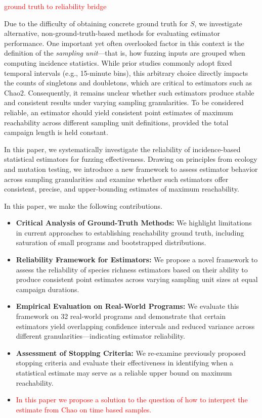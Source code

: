 \documentclass[conference]{IEEEtran}
\begin{document}
\textcolor{red}{ground truth to reliability bridge}

Due to the difficulty of obtaining concrete ground truth for $S$, we investigate alternative, non-ground-truth-based methods for evaluating estimator performance. One important yet often overlooked factor in this context is the definition of the \emph{sampling unit}—that is, how fuzzing inputs are grouped when computing incidence statistics. While prior studies commonly adopt fixed temporal intervals (e.g., 15-minute bins), this arbitrary choice directly impacts the counts of singletons and doubletons, which are critical to estimators such as Chao2. Consequently, it remains unclear whether such estimators produce stable and consistent results under varying sampling granularities. To be considered reliable, an estimator should yield consistent point estimates of maximum reachability across different sampling unit definitions, provided the total campaign length is held constant.

In this paper, we systematically investigate the reliability of incidence-based statistical estimators for fuzzing effectiveness. Drawing on principles from ecology and mutation testing, we introduce a new framework to assess estimator behavior across sampling granularities and examine whether such estimators offer consistent, precise, and upper-bounding estimates of maximum reachability. 

In this paper, we make the following contributions.

\begin{itemize}
    \item \textbf{Critical Analysis of Ground-Truth Methods:} We highlight limitations in current approaches to establishing reachability ground truth, including saturation of small programs and bootstrapped distributions.
    
    \item \textbf{Reliability Framework for Estimators:} We propose a novel framework to assess the reliability of species richness estimators based on their ability to produce consistent point estimates across varying sampling unit sizes at equal campaign durations.
    
    \item \textbf{Empirical Evaluation on Real-World Programs:} We evaluate this framework on 32 real-world programs and demonstrate that certain estimators yield overlapping confidence intervals and reduced variance across different granularities—indicating estimator reliability.
    
    \item \textbf{Assessment of Stopping Criteria:} We re-examine previously proposed stopping criteria and evaluate their effectiveness in identifying when a statistical estimate may serve as a reliable upper bound on maximum reachability.

    \item\textcolor{red}{In this paper we propose a solution to the question of how to interpret the estimate from Chao on time based samples.}
\end{itemize}
\end{document}
